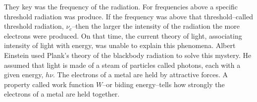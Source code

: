 \documentclass[main.tex]{subfiles}
\newcommand\chapterlabel{electrons}
\begin{document}
\begin{description}
\begin{center}
\end{center}

They key was the frequency of the radiation. For frequencies above a specific threshold radiation was produce. If the frequency was above that threshold--called threshold radiation, $\nu_c$--then the larger the intensity of the radiation the more electrons were produced. On that time, the current theory of light, associating intensity of light with energy, was unable to explain this phenomena. Albert Einstein used Plank's theory of the blackbody radiation to solve this mystery.
He assumed that light is made of a steam of particles called photons, each with a given energy, $h\nu$. The electrons of a metal are held by attractive forces. A property called work function $W$--or biding energy--tells how strongly the electrons of a metal are held together. 


\end{description}
\end{document}
